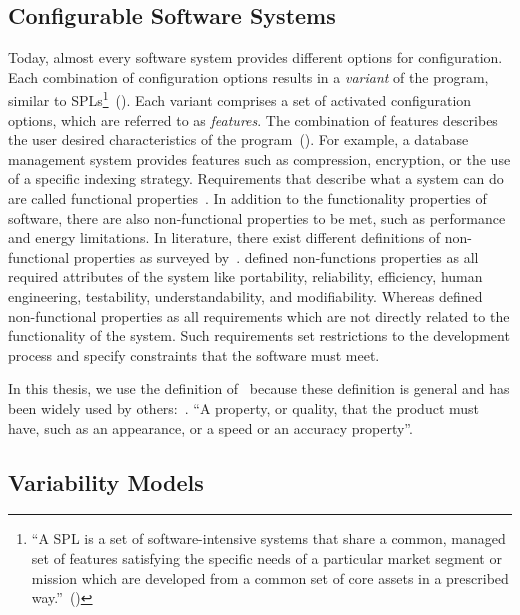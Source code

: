 \subsection{Configurable Software Systems}
\label{background_conf_sys}
Today, almost every software system provides different options for configuration. 
Each combination of configuration options results in a \textit{variant} of the program, similar to \acp{SPL}\footnote{``A \ac{SPL} is a set of software-intensive systems that share a common, managed set of features satisfying the specific needs of a particular market segment or mission which are developed from a common set of core assets in a prescribed way.''~(\cite{northrop2010spl})}~(\cite{siegmund2012spl}). 
Each variant comprises a set of activated configuration options, which are referred to as \textit{features}. 
The combination of features describes the user desired characteristics of the program~(\cite{czarnecki2000generative}).
For example, a database management system provides features such as compression, encryption, or the use of a specific indexing strategy.
Requirements that describe what a system can do are called functional properties~\cite{chung1995using}. 
In addition to the functionality properties of software, there are also non-functional properties to be met, such as performance and energy limitations.
In literature, there exist different definitions of non-functional properties as surveyed by~\cite{glinz2007non}. \cite{davis1993software} defined non-functions properties as all required attributes of the system like portability, reliability, efficiency, human engineering, testability, understandability, and modifiability. 
Whereas \cite{kotonya1998requirements} defined non-functional properties as all requirements which are not directly related to the functionality of the system. 
Such requirements set restrictions to the development process and specify constraints that the software must meet.

In this thesis, we use the definition of~\cite{robertson1999mastering} because these definition is general and has been widely used by others:~\cite{nuseibeh2000requirements,jackson2001problem,cohn2004user,siegmund2012spl}. ``A property, or quality, that the product must have, such as an appearance, or a speed or an accuracy property''.

\subsection{Variability Models}
\label{background_variab_models}

